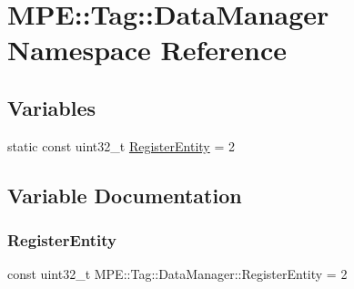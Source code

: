 \hypertarget{namespace_m_p_e_1_1_tag_1_1_data_manager}{}\section{M\+PE\+:\+:Tag\+:\+:Data\+Manager Namespace Reference}
\label{namespace_m_p_e_1_1_tag_1_1_data_manager}
\subsection*{Variables}
\begin{DoxyCompactItemize}
\item 
static const uint32\+\_\+t \hyperlink{namespace_m_p_e_1_1_tag_1_1_data_manager_a0752ea1b8c0896c530b94efeed0d76cc}{Register\+Entity} = 2
\end{DoxyCompactItemize}


\subsection{Variable Documentation}
\mbox{\label{namespace_m_p_e_1_1_tag_1_1_data_manager_a0752ea1b8c0896c530b94efeed0d76cc}} 
\subsubsection{\texorpdfstring{Register\+Entity}{RegisterEntity}}
{\footnotesize\ttfamily const uint32\+\_\+t M\+P\+E\+::\+Tag\+::\+Data\+Manager\+::\+Register\+Entity = 2\hspace{0.3cm}{\ttfamily [static]}}

